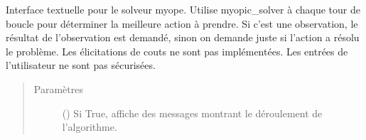 \documentclass[letterpaper,10pt,french]{sphinxmanual}
\begin{document}
\begin{fulllineitems}
\begin{fulllineitems}
\begin{quote}
\begin{description}
\begin{itemize}
\end{itemize}


\end{description}\end{quote}

\end{fulllineitems}


\begin{fulllineitems}
\label{\detokenize{index:DecisionTheoreticTroubleshooting.TroubleShootingProblem.myopic_wraper}}
Interface textuelle pour le solveur myope. Utilise myopic\_solver à
chaque tour de boucle pour déterminer la meilleure action à prendre.
Si c’est une observation, le résultat de l’observation est demandé,
sinon on demande juste si l’action a résolu le problème. Les
élicitations de couts ne sont pas implémentées. Les entrées de
l’utilisateur ne sont pas sécurisées.
\begin{quote}\begin{description}
\item[{Paramètres}] \leavevmode
{} (\sphinxstyleliteralemphasis{\sphinxupquote{, }}) \textendash{} Si True, affiche des messages montrant le déroulement de
l’algorithme.

\end{description}\end{quote}

\end{fulllineitems}



\end{fulllineitems}
\end{document}
